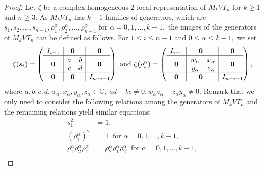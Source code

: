 \documentclass[preprint]{elsarticle}
\begin{document}
\begin{proof}
    Let $\zeta$ be a complex homogeneous $2$-local  representation of $M_kVT_n$ for  \(k \geq 1\) and \(n \geq 3\). As $M_kVT_n$ has $k+1$ families of generators, which are $s_1,s_2,\dots,s_{n-1},\rho_1^{\alpha},\rho_2^{\alpha},\dots,\rho_{n-1}^{\alpha}$ for $\alpha=0,1,\dots,k-1,$ the images of the generators of $M_kVT_n$ can be defined as follows.
    For $ 1\leq i \leq n-1$ and $0 \leq \alpha \leq k-1,$ we set
    {\small
    $$\zeta(s_i)=\left( \begin{array}{c|@{}c|c@{}}
   \begin{matrix}
     I_{i-1} 
   \end{matrix} 
      & \textbf{0} & \textbf{0} \\
      \hline
    \textbf{0} &\hspace{0.2cm} \begin{matrix}
   		a & b\\
   		c & d\\
   		\end{matrix}  & \textbf{0}  \\
\hline
\textbf{0} & \textbf{0} & I_{n-i-1}
\end{array} \right) \text{ and } 
\zeta(\rho_i^{\alpha})=\left( \begin{array}{c|@{}c|c@{}}
   \begin{matrix}
     I_{i-1} 
   \end{matrix} 
      & \textbf{0} & \textbf{0} \\
      \hline
    \textbf{0} &\hspace{0.2cm} \begin{matrix}
   		w_{\alpha} & x_{\alpha}\\
   		y_{\alpha} & z_{\alpha}\\
   		\end{matrix}  & \textbf{0}  \\
\hline
\textbf{0} & \textbf{0} & I_{n-i-1}
\end{array} \right),$$
}
where $a,b,c,d,w_{\alpha},x_{\alpha},y_{\alpha},z_{\alpha} \in \mathbb{C},~ ad-bc \neq 0,w_{\alpha}z_{\alpha}-z_{\alpha}y_{\alpha} \neq 0.$ Remark that we only need to consider the following relations among the generators of $M_kVT_n$ and the remaining relations yield similar equations:
\begin{align*}
    s_1^2 &= 1,\\
    (\rho_1^\alpha )^2 &= 1 \  \text{ for } \alpha=0,1,\dots,k-1,\\
    \rho_1^{\alpha} \rho_{2}^{\alpha} \rho_1^{\alpha} &= \rho_{2}^{\alpha} \rho_1^{\alpha} \rho_{2}^{\alpha} \ \text{ for } \alpha=0,1,\dots,k-1,\\

\end{align*}
\end{proof}
\end{document}
